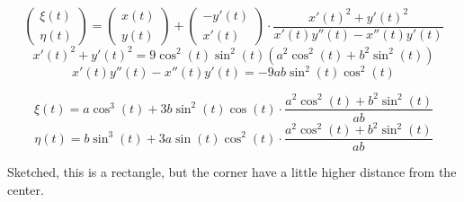 \documentclass[a4paper]{article}
\theoremstyle{definition}
\begin{document}
\[ \begin{pmatrix} \xi(t) \\ \eta(t) \end{pmatrix}
= \begin{pmatrix} x(t) \\ y(t) \end{pmatrix} + \begin{pmatrix} -y'(t) \\ x'(t) \end{pmatrix} \cdot \frac{x'(t)^2 + y'(t)^2}{x'(t) y''(t) - x''(t) y'(t)} \]
\[ x'(t)^2 + y'(t)^2 = 9\cos^2(t) \sin^2(t) (a^2 \cos^2(t) + b^2 \sin^2(t)) \]
\[ x'(t) y''(t) - x''(t) y'(t) = -9ab\sin^2(t) \cos^2(t) \]

\[ \xi(t) = a \cos^3(t) + 3b \sin^2(t) \cos(t) \cdot \frac{a^2 \cos^2(t) + b^2 \sin^2(t)}{ab} \]
\[ \eta(t) = b\sin^3(t) + 3a \sin(t) \cos^2(t) \cdot \frac{a^2 \cos^2(t) + b^2 \sin^2(t)}{ab} \]

Sketched, this is a rectangle, but the corner have a little higher distance from the center.
\end{document}
